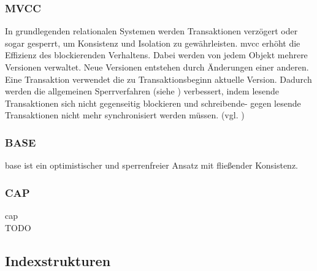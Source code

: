 \subsubsection{MVCC}
In grundlegenden relationalen Systemen werden Transaktionen verzögert oder sogar gesperrt, um Konsistenz und Isolation zu gewährleisten.
\Gls{mvcc} erhöht die Effizienz des  blockierenden Verhaltens.
Dabei werden von jedem Objekt mehrere Versionen verwaltet.
Neue Versionen entstehen durch Änderungen einer anderen.
Eine Transaktion verwendet die zu Transaktionsbeginn aktuelle Version.
Dadurch werden die allgemeinen Sperrverfahren (siehe \cite[S.266 ff.]{book:kudrass}) verbessert, indem lesende Transaktionen sich nicht gegenseitig blockieren und schreibende- gegen lesende Transaktionen nicht mehr synchronisiert werden müssen. (vgl. \cite[S.270]{book:kudrass})

\subsubsection{BASE}
\Gls{base} ist ein optimistischer und sperrenfreier Ansatz mit fließender Konsistenz.
\cite{book:nosql-einfuehrung}

\subsubsection{CAP}
\Gls{cap}\\
TODO






\subsection{Indexstrukturen}


